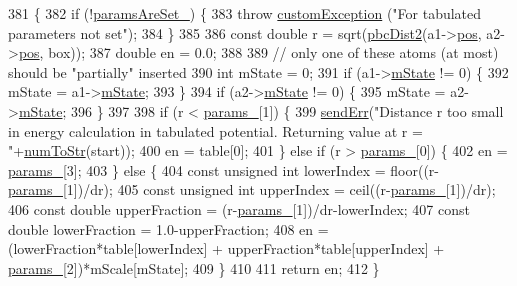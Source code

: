 \begin{DoxyCode}
381                                                                                          \{
382     \textcolor{keywordflow}{if} (!\hyperlink{classpair_potential_a635755c0a952bfc05a4cfae230c3dbd2}{paramsAreSet\_}) \{
383         \textcolor{keywordflow}{throw} \hyperlink{classcustom_exception}{customException} (\textcolor{stringliteral}{"For tabulated parameters not set"});
384     \}
385 
386     \textcolor{keyword}{const} \textcolor{keywordtype}{double} r = sqrt(\hyperlink{utilities_8cpp_abb1db3a8a3ac46e044bbe7b2c5684c0a}{pbcDist2}(a1->\hyperlink{classatom_a3ae5f4880e7831d8b2c9fda72b4eb24a}{pos}, a2->\hyperlink{classatom_a3ae5f4880e7831d8b2c9fda72b4eb24a}{pos}, box));
387     \textcolor{keywordtype}{double} en = 0.0;
388 
389     \textcolor{comment}{// only one of these atoms (at most) should be "partially" inserted}
390     \textcolor{keywordtype}{int} mState = 0;
391     \textcolor{keywordflow}{if} (a1->\hyperlink{classatom_a3cb00c0c5b7533657e05af6ff4a42740}{mState} != 0) \{
392         mState = a1->\hyperlink{classatom_a3cb00c0c5b7533657e05af6ff4a42740}{mState};
393     \}
394     \textcolor{keywordflow}{if} (a2->\hyperlink{classatom_a3cb00c0c5b7533657e05af6ff4a42740}{mState} != 0) \{
395         mState = a2->\hyperlink{classatom_a3cb00c0c5b7533657e05af6ff4a42740}{mState};
396     \}
397 
398     \textcolor{keywordflow}{if} (r < \hyperlink{classpair_potential_abf8ec8af983d6e9960bd149da099e883}{params\_}[1]) \{
399         \hyperlink{utilities_8cpp_a6dacf3c3c19aa1e13a4d5a148fe5114e}{sendErr}(\textcolor{stringliteral}{"Distance r too small in energy calculation in tabulated potential. Returning value
       at r = "}+\hyperlink{utilities_8h_ae6ed8fadf719af789711a7c0e99f44bc}{numToStr}(start));
400         en = table[0];
401     \} \textcolor{keywordflow}{else} \textcolor{keywordflow}{if} (r > \hyperlink{classpair_potential_abf8ec8af983d6e9960bd149da099e883}{params\_}[0]) \{
402         en = \hyperlink{classpair_potential_abf8ec8af983d6e9960bd149da099e883}{params\_}[3];
403     \} \textcolor{keywordflow}{else} \{
404         \textcolor{keyword}{const} \textcolor{keywordtype}{unsigned} \textcolor{keywordtype}{int} lowerIndex = floor((r-\hyperlink{classpair_potential_abf8ec8af983d6e9960bd149da099e883}{params\_}[1])/dr);
405         \textcolor{keyword}{const} \textcolor{keywordtype}{unsigned} \textcolor{keywordtype}{int} upperIndex = ceil((r-\hyperlink{classpair_potential_abf8ec8af983d6e9960bd149da099e883}{params\_}[1])/dr);
406         \textcolor{keyword}{const} \textcolor{keywordtype}{double} upperFraction = (r-\hyperlink{classpair_potential_abf8ec8af983d6e9960bd149da099e883}{params\_}[1])/dr-lowerIndex;
407         \textcolor{keyword}{const} \textcolor{keywordtype}{double} lowerFraction = 1.0-upperFraction;
408         en = (lowerFraction*table[lowerIndex] + upperFraction*table[upperIndex] + 
      \hyperlink{classpair_potential_abf8ec8af983d6e9960bd149da099e883}{params\_}[2])*mScale[mState];
409     \}
410 
411     \textcolor{keywordflow}{return} en;
412 \}
\end{DoxyCode}
